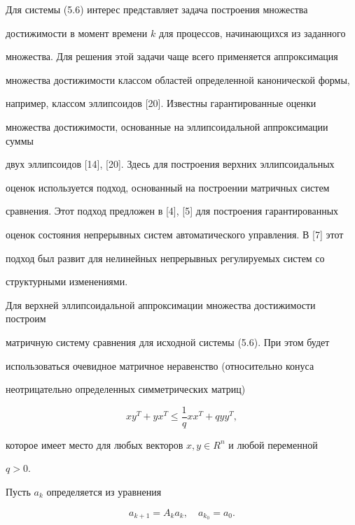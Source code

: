 Для системы (5.6) интерес представляет задача построения множества


достижимости в момент времени $k$ для процессов, начинающихся из заданного


множества. Для решения этой задачи чаще всего применяется аппроксимация


множества достижимости классом областей определенной канонической формы,


например, классом эллипсоидов [20]. Известны гарантированные оценки


множества достижимости, основанные на эллипсоидальной аппроксимации суммы


двух эллипсоидов [14], [20]. Здесь для построения верхних эллипсоидальных


оценок используется подход, основанный на построении матричных систем


сравнения. Этот подход предложен в [4], [5] для построения гарантированных


оценок состояния непрерывных систем автоматического управления. В [7] этот


подход был развит для нелинейных непрерывных регулируемых систем со


структурными изменениями.





Для верхней эллипсоидальной аппроксимации множества достижимости построим


матричную систему сравнения для исходной системы (5.6). При этом будет


использоваться очевидное матричное неравенство (относительно конуса


неотрицательно определенных симметрических матриц)


\begin{equation}


xy^T+yx^T\le\frac{1}{q}xx^T+qyy^T,


\end{equation}


которое имеет место для любых векторов $x,y\in R^n$ и любой переменной


$q>0$.





Пусть $a_k$ определяется из уравнения


\begin{equation}


a_{k+1}=A_k a_k,\quad a_{k_0}=a_0.


\end{equation}


